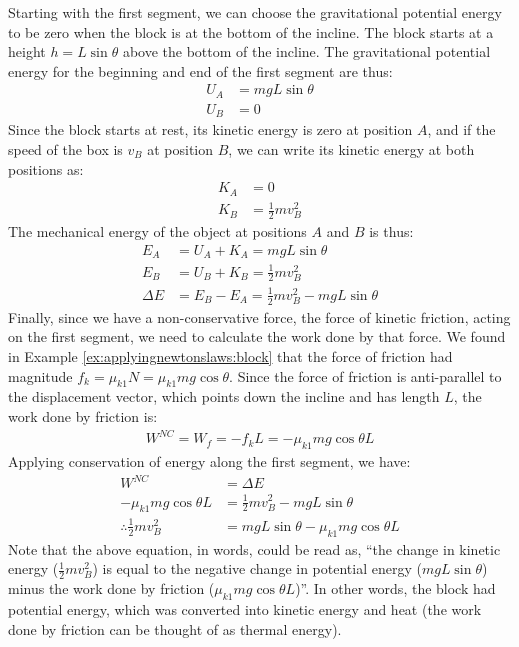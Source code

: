 \begin{example}
Starting with the first segment, we can choose the gravitational potential energy to be zero when the block is at the bottom of the incline. The block starts at a height $h=L\sin\theta$ above the  bottom of the incline. The gravitational potential energy for the beginning and end of the first segment are thus:
\begin{align*}
U_A &= mgL\sin\theta\\
U_B &= 0
\end{align*}
Since the block starts at rest, its kinetic energy is zero at position $A$, and if the speed of the box is $v_B$ at position $B$, we can write its kinetic energy at both positions as:
\begin{align*}
K_A &=0\\
K_B &= \frac{1}{2}mv_B^2
\end{align*}
The mechanical energy of the object at positions $A$ and $B$ is thus:
\begin{align*}
E_A &= U_A+K_A = mgL\sin\theta\\
E_B &= U_B+K_B = \frac{1}{2}mv_B^2\\
\Delta E &= E_B - E_A = \frac{1}{2}mv_B^2 - mgL\sin\theta
\end{align*}
Finally, since we have a non-conservative force, the force of kinetic friction, acting on the first segment, we need to calculate the work done by that force. We found in Example \ref{ex:applyingnewtonslaws:block} that the force of friction had magnitude $f_k=\mu_{k1}N=\mu_{k1}mg\cos\theta$. Since the force of friction is anti-parallel to the displacement vector, which points down the incline and has length $L$, the work done by friction is:
\begin{align*}
W^{NC}=W_f = -f_kL=-\mu_{k1}mg\cos\theta L
\end{align*}
Applying conservation of energy along the first segment, we have:
\begin{align*}
W^{NC} &= \Delta E\\
-\mu_{k1}mg\cos\theta L &= \frac{1}{2}mv_B^2 - mgL\sin\theta\\
\therefore \frac{1}{2}mv_B^2 &= mgL\sin\theta-\mu_{k1}mg\cos\theta L 
\end{align*}
Note that the above equation, in words, could be read as, ``the change in kinetic energy ($\frac{1}{2}mv_B^2$) is equal to the negative change in potential energy ($mgL\sin\theta$) minus the work done by friction ($\mu_{k1}mg\cos\theta L$)''. In other words, the block had potential energy, which was converted into kinetic energy and heat (the work done by friction can be thought of as thermal energy). 


\end{example}
